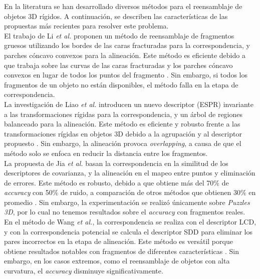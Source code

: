 
En la literatura se han desarrollado diversos métodos para el reensamblaje de objetos 3D rígidos. A continuación, se describen las características de las propuestas más recientes para resolver este problema. \\

El trabajo de Li \textit{et al.} proponen un método de reensamblaje de fragmentos gruesos utilizando los bordes de las caras fracturadas para la correspondencia, y parches cóncavo convexos para la alineación. Este método es eficiente debido a que trabaja sobre las curvas de las caras fracturadas y los parches cóncavo convexos en lugar de todos los puntos del fragmento \cite{3}. Sin embargo, si todos los fragmentos de un objeto no están disponibles, el método falla en la etapa de correspondencia. \\

La investigación de Liao \textit{et al.} introducen un nuevo descriptor (ESPR) invariante a las transformaciones rígidas para la correspondencia, y un árbol de regiones balanceado para la alineación. Este método es eficiente y robusto frente a las transformaciones rígidas en objetos 3D debido a la agrupación y al descriptor propuesto \cite{5}. Sin embargo, la alineación provoca \textit{overlapping}, a causa de que el método solo se enfoca en reducir la distancia entre los fragmentos. \\

La propuesta de Jia \textit{et al.} basan la correspondencia en la similitud de los descriptores de covarianza, y la alineación en el mapeo entre puntos y eliminación de errores. Este método es robusto, debido a que obtiene más del 70\% de \textit{accuracy} con 50\% de ruido, a comparación de otros métodos que obtienen 30\% en promedio \cite{6}. Sin embargo, la experimentación se realizó únicamente sobre \textit{Puzzles 3D}, por lo cual no tenemos resultados sobre el \textit{accuracy} con fragmentos reales. \\

En el método de Wang \textit{et al.}, la correspondencia se realiza con el descriptor LCD, y con la correspondencia potencial se calcula el descriptor SDD para eliminar los pares incorrectos en la etapa de alineación. Este método es versátil porque obtiene resultados notables con fragmentos de diferentes características \cite{7}. Sin embargo, en los casos extremos, como el reensamblaje de objetos con alta curvatura, el \textit{accuracy} disminuye significativamente.

